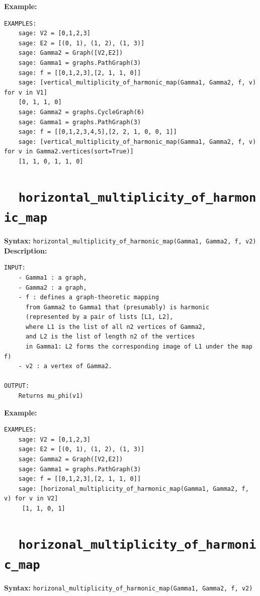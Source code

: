 \documentclass{article}
\begin{document}
\textbf{Example:}
\begin{verbatim}
EXAMPLES:
    sage: V2 = [0,1,2,3]
    sage: E2 = [(0, 1), (1, 2), (1, 3)]
    sage: Gamma2 = Graph([V2,E2])
    sage: Gamma1 = graphs.PathGraph(3)
    sage: f = [[0,1,2,3],[2, 1, 1, 0]]
    sage: [vertical_multiplicity_of_harmonic_map(Gamma1, Gamma2, f, v) for v in V1]
    [0, 1, 1, 0]
    sage: Gamma2 = graphs.CycleGraph(6)
    sage: Gamma1 = graphs.PathGraph(3)
    sage: f = [[0,1,2,3,4,5],[2, 2, 1, 0, 0, 1]]
    sage: [vertical_multiplicity_of_harmonic_map(Gamma1, Gamma2, f, v) for v in Gamma2.vertices(sort=True)]
    [1, 1, 0, 1, 1, 0]
\end{verbatim}

\section{\tt \ \ horizontal\_multiplicity\_of\_harmonic\_map}

\textbf{Syntax:} \verb}horizontal_multiplicity_of_harmonic_map(Gamma1, Gamma2, f, v2)}\\

\textbf{Description:}
\begin{verbatim}
INPUT:
    - Gamma1 : a graph, 
    - Gamma2 : a graph, 
    - f : defines a graph-theoretic mapping
      from Gamma2 to Gamma1 that (presumably) is harmonic
      (represented by a pair of lists [L1, L2],
      where L1 is the list of all n2 vertices of Gamma2,
      and L2 is the list of length n2 of the vertices
      in Gamma1: L2 forms the corresponding image of L1 under the map f)
    - v2 : a vertex of Gamma2.
    
OUTPUT:
    Returns mu_phi(v1)
\end{verbatim}

\textbf{Example:}
\begin{verbatim}
EXAMPLES:
    sage: V2 = [0,1,2,3]
    sage: E2 = [(0, 1), (1, 2), (1, 3)]
    sage: Gamma2 = Graph([V2,E2])
    sage: Gamma1 = graphs.PathGraph(3)
    sage: f = [[0,1,2,3],[2, 1, 1, 0]]
    sage: [horizonal_multiplicity_of_harmonic_map(Gamma1, Gamma2, f, v) for v in V2]
     [1, 1, 0, 1]
\end{verbatim}

\section{\tt \ \ horizonal\_multiplicity\_of\_harmonic\_map}

\textbf{Syntax:} \verb}horizonal_multiplicity_of_harmonic_map(Gamma1, Gamma2, f, v2)}\\
\end{document}
